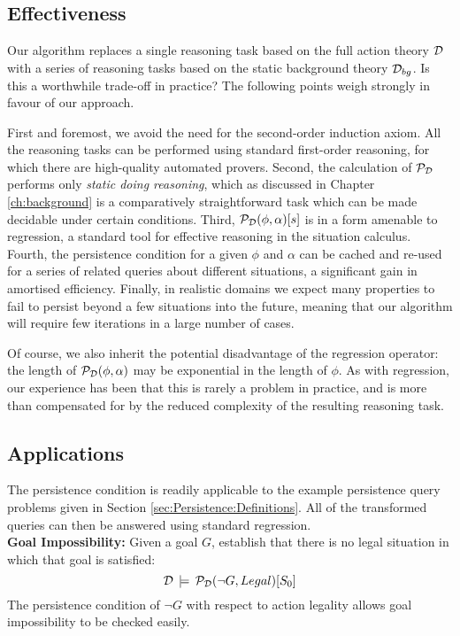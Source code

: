 \subsection{Effectiveness}

Our algorithm replaces a single reasoning task based on the full action
theory $\mathcal{D}$ with a series of reasoning tasks based on the static
background theory $\mathcal{D}_{bg}$. Is this a worthwhile trade-off in practice?
The following points weigh strongly in favour of our approach.

First and foremost, we avoid the need for the second-order induction
axiom. All the reasoning tasks can be performed using standard first-order
reasoning, for which there are high-quality automated provers. Second,
the calculation of $\mathcal{P}_{\mathcal{D}}$ performs only \emph{static doing
reasoning}, which as discussed in Chapter \ref{ch:background} is
a comparatively straightforward task which can be made decidable under
certain conditions. Third, $\mathcal{P}_{\mathcal{D}}(\phi,\alpha)[s]$ is in a form
amenable to regression, a standard tool for effective reasoning in
the situation calculus. Fourth, the persistence condition for a given
$\phi$ and $\alpha$ can be cached and re-used for a series of related
queries about different situations, a significant gain in amortised
efficiency. Finally, in realistic domains we expect many properties
to fail to persist beyond a few situations into the future, meaning
that our algorithm will require few iterations in a large number of
cases.

Of course, we also inherit the potential disadvantage of the regression
operator: the length of $\mathcal{P}_{\mathcal{D}}(\phi,\alpha)$ may be exponential
in the length of $\phi$. As with regression, our experience has been
that this is rarely a problem in practice, and is more than compensated
for by the reduced complexity of the resulting reasoning task.


\subsection{Applications}

The persistence condition is readily applicable to the example persistence
query problems given in Section \ref{sec:Persistence:Definitions}.
All of the transformed queries can then be answered using standard
regression.\\


\textbf{Goal Impossibility:} Given a goal $G$, establish that there
is no legal situation in which that goal is satisfied:\[
\mathcal{D}\,\models\,\mathcal{P}_{\mathcal{D}}(\neg G,Legal)[S_{0}]\]
 The persistence condition of $\neg G$ with respect to action legality
allows goal impossibility to be checked easily.\\



